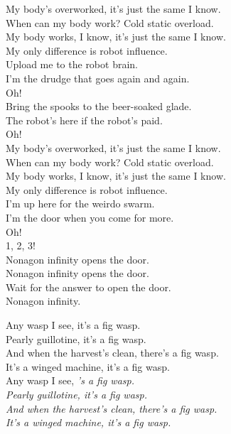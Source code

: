 My body's overworked, it's just the same I know. \\
When can my body work? Cold static overload. \\
My body works, I know, it's just the same I know. \\
My only difference is robot influence. \\

Upload me to the robot brain. \\
I'm the drudge that goes again and again. \\
Oh! \\

Bring the spooks to the beer-soaked glade. \\
The robot's here if the robot's paid. \\
Oh! \\

My body's overworked, it's just the same I know. \\
When can my body work? Cold static overload. \\
My body works, I know, it's just the same I know. \\
My only difference is robot influence. \\

I'm up here for the weirdo swarm. \\
I'm the door when you come for more. \\
Oh! \\

1, 2, 3! \\

Nonagon infinity opens the door. \\
Nonagon infinity opens the door. \\
Wait for the answer to open the door. \\
Nonagon infinity. \\




Any wasp I see, it's a fig wasp. \\
Pearly guillotine, it's a fig wasp. \\
And when the harvest's clean, there's a fig wasp. \\
It's a winged machine, it's a fig wasp. \\

Any wasp I see, \it's a fig wasp. \\
Pearly guillotine, it's a fig wasp. \\
And when the harvest's clean, there's a fig wasp. \\
It's a winged machine, it's a fig wasp. \\

